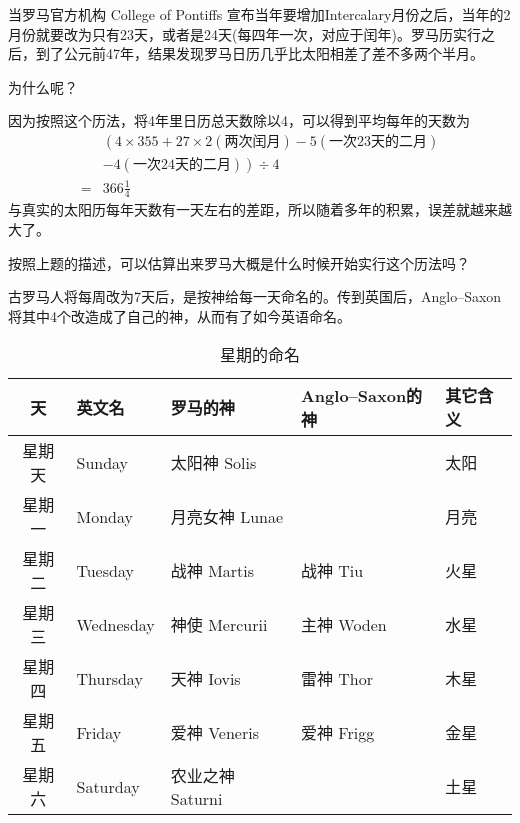 \begin{example}
  当罗马官方机构 College of Pontiffs 宣布当年要增加Intercalary月份之后，当年的2月份就要改为只有23天，或者是24天(每四年一次，对应于闰年)。罗马历实行之后，到了公元前47年，结果发现罗马日历几乎比太阳相差了差不多两个半月。

  为什么呢？

  因为按照这个历法，将4年里日历总天数除以4，可以得到平均每年的天数为
  \begin{align*}
    & \left(4 \times 355 + 27 \times 2(\text{两次闰月}) - 5 (\text{一次23天的二月})\right.\\
    & \left. - 4 (\text{一次24天的二月})\right) \div 4\\
    = & 366\frac14
  \end{align*}
  与真实的太阳历每年天数有一天左右的差距，所以随着多年的积累，误差就越来越大了。
\end{example}

\begin{question}
  按照上题的描述，可以估算出来罗马大概是什么时候开始实行这个历法吗？
\end{question}


\begin{example}
  古罗马人将每周改为7天后，是按神给每一天命名的。传到英国后，Anglo--Saxon将其中4个改造成了自己的神，从而有了如今英语命名。
  \begin{table}[htbp]
    \centering
    \begin{tabular}{cllll}
      \toprule
      天     & 英文名    & 罗马的神         & Anglo--Saxon的神 & 其它含义 \\\midrule
      星期天 & Sunday    & 太阳神 Solis     &                  & 太阳     \\
      星期一 & Monday    & 月亮女神 Lunae   &                  & 月亮     \\
      星期二 & Tuesday   & 战神 Martis      & 战神 Tiu         & 火星     \\
      星期三 & Wednesday & 神使 Mercurii    & 主神 Woden       & 水星     \\
      星期四 & Thursday  & 天神 Iovis       & 雷神 Thor        & 木星     \\
      星期五 & Friday    & 爱神 Veneris     & 爱神 Frigg       & 金星     \\
      星期六 & Saturday  & 农业之神 Saturni &                  & 土星     \\
      \bottomrule
    \end{tabular}
    \caption{星期的命名}
    \label{tab:name-of-week-day}
  \end{table}
\end{example}

